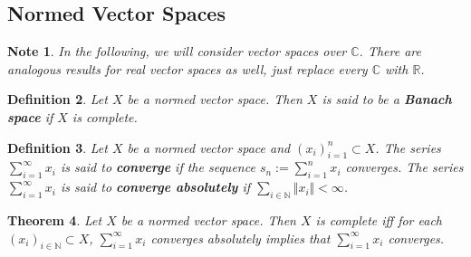 \documentclass[12pt]{amsart}
\newtheorem{thm}{Theorem}[section]
\newtheorem{defn}[thm]{Definition}
\newtheorem{note}[thm]{Note}
\newcommand{\C}{\mathbb{C}}
\newcommand{\N}{\mathbb{N}}
\newcommand{\R}{\mathbb{R}}
\newcommand{\seq}[1]{(x_{#1})_{#1 \in \N}}
\newcommand{\n}{\Vert}
\begin{document}
\subsection{Normed Vector Spaces}
\begin{note}
In the following, we will consider vector spaces over $\C$. There are analogous results for real vector spaces as well, just replace every $\C$ with $\R$.
\end{note}

\begin{defn}
Let $X$ be a normed vector space. Then $X$ is said to be a \textbf{Banach space} if $X$ is complete.  
\end{defn}

\begin{defn}
Let $X$ be a normed vector space and $(x_i)_{i=1}^n \subset X$. The series $\sum_{i =1}^{\infty}x_i$ is said to \textbf{converge} if the sequence $s_n := \sum_{i=1}^n x_i$ converges. The series $\sum_{i =1}^{\infty}x_i$ is said to \textbf{converge absolutely} if $\sum_{i\in \N}\n x_i \n < \infty$.
\end{defn}

\begin{thm}
Let $X$ be a normed vector space. Then $X$ is complete iff for each $\seq{i} \subset X$, $\sum_{i =1}^{\infty}x_i$ converges absolutely implies that $\sum_{i=1}^{\infty}x_i$ converges. 
\end{thm}
\end{document}

